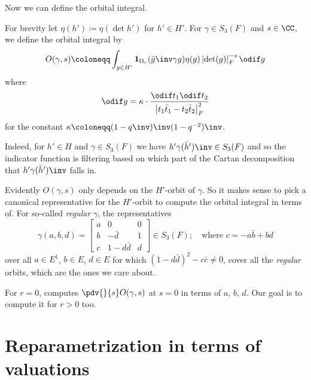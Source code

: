 Now we can define the orbital integral.
\begin{definition}
  For brevity let $\eta(h') \coloneqq \eta(\det h')$ for $h' \in H'$.
  For $\gamma \in S_3(F)$ and $s \in \CC$, we define the orbital integral by
  \[ O(\gamma, s) \coloneqq
    \int_{g \in H'} \mathbf{1}_{\Omega_r}(\bar g\inv \gamma g) \eta(g)
    \left\lvert \det(g) \right\rvert_F^{-s} \odif g \]
  where
  \[ \odif g = \kappa \cdot \frac{\odif t_1 \odif t_2}
    {\left\lvert t_1 \bar t_1 - t_2 \bar t_2 \right\rvert_F^2} \]
  for the constant $\kappa \coloneqq (1-q\inv)\inv(1-q^{-2})\inv$.
\end{definition}

Indeed, for $h' \in H$ and $\gamma \in S_3(F)$ we have $h' \gamma (\bar h')\inv \in S_3(F)$
and so the indicator function is filtering based on which part of the
Cartan decomposition that $h' \gamma (\bar h')\inv$ falls in.

Evidently $O(\gamma, s)$ only depends on the $H'$-orbit of $\gamma$.
So it makes sense to pick a canonical representative for the $H'$-orbit to compute
the orbital integral in terms of.
For so-called \emph{regular} $\gamma$, the representatives
\[ \gamma(a,b,d) =
  \begin{bmatrix}
    a & 0 & 0 \\
    b & - \bar d & 1 \\
    c & 1 - d \bar d & d
  \end{bmatrix}
  \in S_3(F); \quad \text{where $c = -a \bar b + b d$} \]
over all $a \in E^1$, $b \in E$, $d \in E$ for which $(1-d\bar d)^2 - c \bar c \neq 0$,
cover all the \emph{regular} orbits, which are the ones we care about.

For $r=0$, \cite{ref:AFL} computes $\pdv{}{s}O(\gamma,s)$ at $s=0$ in terms of $a$, $b$, $d$.
Our goal is to compute it for $r > 0$ too.

\section{Reparametrization in terms of valuations}
